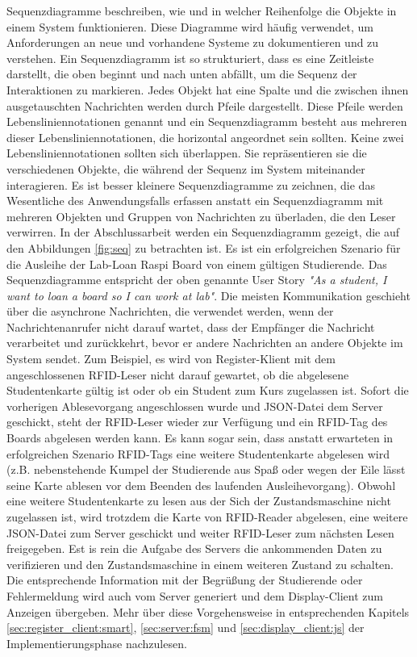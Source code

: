 Sequenzdiagramme beschreiben, wie und in welcher Reihenfolge die Objekte in einem System funktionieren. Diese Diagramme wird häufig verwendet, um Anforderungen an neue und vorhandene Systeme zu dokumentieren und zu verstehen. Ein Sequenzdiagramm ist so strukturiert, dass es eine Zeitleiste darstellt, die oben beginnt und nach unten abfällt, um die Sequenz der Interaktionen zu markieren. Jedes Objekt hat eine Spalte und die zwischen ihnen ausgetauschten Nachrichten werden durch Pfeile dargestellt. Diese Pfeile werden Lebensliniennotationen genannt und ein Sequenzdiagramm besteht aus mehreren dieser Lebensliniennotationen, die horizontal angeordnet sein sollten. Keine zwei Lebensliniennotationen sollten sich überlappen. Sie repräsentieren sie die verschiedenen Objekte, die während der Sequenz im System miteinander interagieren. Es ist besser kleinere Sequenzdiagramme zu zeichnen, die das Wesentliche des Anwendungsfalls erfassen
anstatt ein Sequenzdiagramm mit mehreren Objekten und Gruppen von Nachrichten zu überladen, die den Leser verwirren. In der Abschlussarbeit werden ein Sequenzdiagramm gezeigt, die auf den Abbildungen \ref{fig:seq} zu betrachten ist. Es ist ein erfolgreichen Szenario für die Ausleihe der Lab-Loan Raspi Board von einem gültigen Studierende. Das Sequenzdiagramme entspricht der oben genannte User Story \textit{"As a student, I want to loan a board so I can work at lab"}. Die meisten Kommunikation geschieht über die asynchrone Nachrichten, die verwendet werden, wenn der Nachrichtenanrufer nicht darauf wartet, dass der Empfänger die Nachricht verarbeitet und zurückkehrt, bevor er andere Nachrichten an andere Objekte im System sendet. Zum Beispiel, es wird von Register-Klient mit dem angeschlossenen RFID-Leser nicht darauf gewartet, ob die abgelesene Studentenkarte gültig ist oder ob ein Student zum Kurs zugelassen ist. Sofort die vorherigen Ablesevorgang angeschlossen wurde und JSON-Datei dem Server geschickt, steht der RFID-Leser wieder zur Verfügung und ein RFID-Tag des Boards abgelesen werden kann. Es kann sogar sein, dass anstatt erwarteten in erfolgreichen Szenario RFID-Tags eine weitere Studentenkarte abgelesen wird (z.B. nebenstehende Kumpel der Studierende aus Spaß oder wegen der Eile lässt seine Karte ablesen vor dem Beenden des laufenden Ausleihevorgang). Obwohl eine weitere Studentenkarte zu lesen aus der Sich der Zustandsmaschine nicht zugelassen ist, wird trotzdem die Karte von RFID-Reader abgelesen, eine weitere JSON-Datei zum Server geschickt und weiter RFID-Leser zum nächsten Lesen freigegeben. Est is rein die Aufgabe des Servers die ankommenden Daten zu verifizieren und den Zustandsmaschine in einem weiteren Zustand zu schalten. Die entsprechende Information mit der Begrüßung der Studierende oder Fehlermeldung wird auch vom Server generiert und dem Display-Client zum Anzeigen übergeben. Mehr über diese Vorgehensweise in entsprechenden Kapitels \ref{sec:register_client:smart}, \ref{sec:server:fsm} und \ref*{sec:display_client:js} der Implementierungsphase nachzulesen. 


